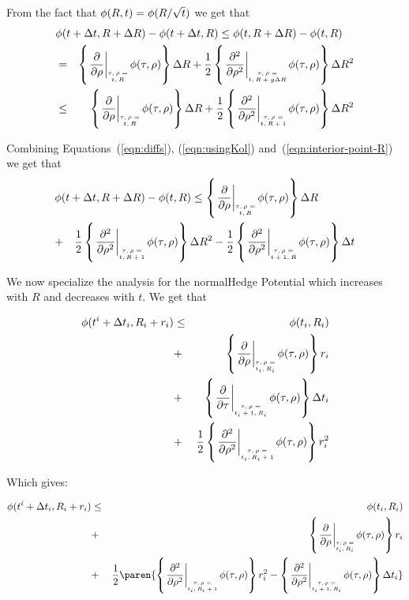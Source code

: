 \documentclass{article}[12pt]
\begin{document}
{From the fact that $\phi(R,t) = \phi(R/\sqrt{t})$ we get that 
\begin{eqnarray}
  \lefteqn{\pot(t+\deltat,\R+\deltaR)-\pot(t+\deltat,\R)
  \leq \pot(t,\R+\deltaR)-\pot(t,\R)}&&\\
  &=&\at{\frac{\partial}{\partial \rho}}{t,R} \deltaR
  +\frac{1}{2} \at{\frac{\partial^2}{\partial \rho^2}}{t,R+g \deltaR} \deltaR^2
  \nonumber \\
  &\leq& \at{\frac{\partial}{\partial \rho}}{t,R} \deltaR
  +\frac{1}{2} \at{\frac{\partial^2}{\partial \rho^2}}{t,R+1} \deltaR^2
  \label{eqn:interior-point-R}
\end{eqnarray}

Combining Equations~(\ref{eqn:diffs}), (\ref{eqn:usingKol}) and~(\ref{eqn:interior-point-R}) we get that
\begin{eqnarray} 
  \lefteqn{\pot(t+\deltat,\R+\deltaR) - \pot(t,\R)
   \leq  \at{\frac{\partial}{\partial \rho}}{t,R} \deltaR} &&\\
   &+&   \frac{1}{2} \at{\frac{\partial^2}{\partial \rho^2}}{t,R+1} \deltaR^2
   - \frac{1}{2} \at{\frac{\partial^2}{\partial \rho^2}}{t+1,R} \deltat
\end{eqnarray}

\iffalse
We now specialize the analysis for the normalHedge Potential which increases with $R$ and decreases with $t$. We get that 

\begin{eqnarray} 
  \pot(t^i+\deltat_i,\R_i+r_i) &\leq& \pot(t_i,\R_i) \\
  &+&\at{\frac{\partial}{\partial \rho}}{t_i,R_i} r_i \\
  &+&\at{\frac{\partial}{\partial \tau}}{t_i+1,R_i}  \deltat_i \\
  &+& \frac{1}{2} \at{\frac{\partial^2}{\partial \rho^2}}{t_i,R_i+1} r_i^2 \\
\end{eqnarray}


Which gives:

\begin{eqnarray} 
  \pot(t^i+\deltat_i,\R_i+r_i) &\leq& \pot(t_i,\R_i) \\
  &+&\at{\frac{\partial}{\partial \rho}}{t_i,R_i} r_i \\
                               &+& \frac{1}{2} \paren{\at{\frac{\partial^2}{\partial \rho^2}}{t_i,R_i+1}r_i^2
                                   - \at{\frac{\partial^2}{\partial \rho^2}}{t_i+1,R_i}\deltat_i}\\
\end{eqnarray}


}
\end{document}
